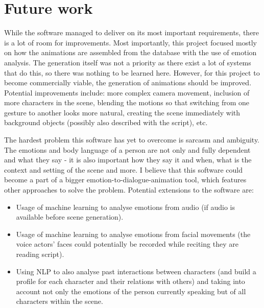 \section{Future work}
While the software managed to deliver on its most important requirements, there is a lot of room for improvements. Most importantly, this project focused mostly on how the animations are assembled from the database with the use of emotion analysis. The generation itself was not a priority as there exist a lot of systems that do this, so there was nothing to be learned here. However, for this project to become commercially viable, the generation of animations should be improved. Potential improvements include: more complex camera movement, inclusion of more characters in the scene, blending the motions so that switching from one gesture to another looks more natural, creating the scene immediately with background objects (possibly also described with the script), etc.

The hardest problem this software has yet to overcome is sarcasm and ambiguity. The emotions and body language of a person are not only and fully dependent and what they say - it is also important how they say it and when, what is the context and setting of the scene and more. I believe that this software could become a part of a bigger emotion-to-dialogue-animation tool, which features other approaches to solve the problem. Potential extensions to the software are:
\begin{itemize}
	\item Usage of machine learning to analyse emotions from audio (if audio is available before scene generation).
	\item Usage of machine learning to analyse emotions from facial movements (the voice actors' faces could potentially be recorded while reciting they are reading script).
	\item Using NLP to also analyse past interactions between characters (and build a profile for each character and their relations with others) and taking into account not only the emotions of the person currently speaking but of all characters within the scene.
\end{itemize}